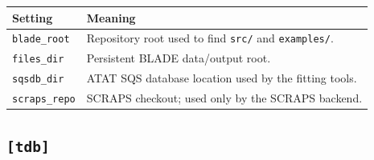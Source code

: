 \documentclass[11pt,letterpaper]{article}
\newcommand{\file}[1]{\nolinkurl{#1}}
\newcommand{\setting}[1]{\nolinkurl{#1}}
\begin{document}
\begin{longtable}{p{}p{}}
\toprule
Setting & Meaning \\
\midrule
\endhead
\setting{blade_root} & Repository root used to find \file{src/} and \file{examples/}. \\
\setting{files_dir} & Persistent BLADE data/output root. \\
\setting{sqsdb_dir} & ATAT SQS database location used by the fitting tools. \\
\setting{scraps_repo} & SCRAPS checkout; used only by the SCRAPS backend. \\
\bottomrule
\end{longtable}

\subsection{\texttt{[tdb]}}
\end{document}

